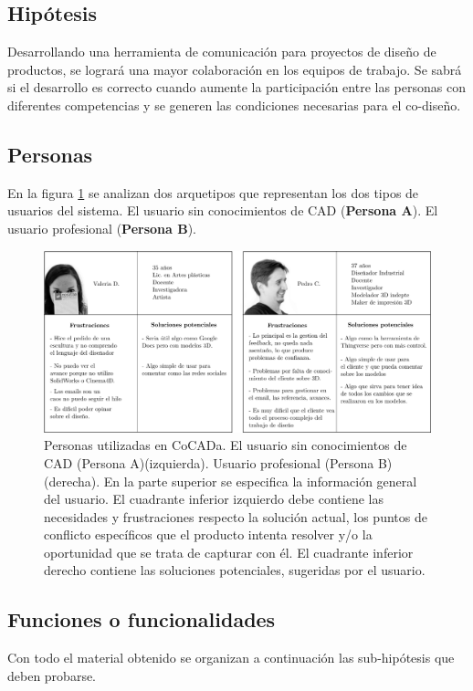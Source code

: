 \subsection{Hipótesis}
Desarrollando una herramienta de comunicación para proyectos de diseño de productos, se logrará una mayor colaboración en los equipos de trabajo. %
Se sabrá si el desarrollo es correcto cuando aumente la participación entre las personas con diferentes competencias y se generen las condiciones necesarias para el co-diseño.

\subsection{Personas}
\label{personas}
En la figura \ref{fig:persona1} se analizan dos arquetipos que representan los dos tipos de usuarios del sistema. El usuario sin conocimientos de CAD (\textbf{Persona A}). El usuario profesional (\textbf{Persona B}).

\begin{figure}[ht]
\includegraphics[width=16cm]{Img/Desarrollo/persona1.png}
\centering
\caption{\footnotesize{Personas utilizadas en CoCADa. El usuario sin conocimientos de CAD (Persona A)(izquierda). Usuario profesional (Persona B)(derecha). En la parte superior se especifica la información general del usuario. El cuadrante inferior izquierdo debe contiene las necesidades y  frustraciones respecto la solución actual, los puntos de conflicto específicos que el producto intenta resolver y/o la oportunidad que se trata de capturar con él. El cuadrante inferior derecho contiene las soluciones potenciales, sugeridas por el usuario.}}
\label{fig:persona1}
\end{figure}

\clearpage
\subsection{Funciones o funcionalidades}
\label{section:subhipo}
Con todo el material obtenido se organizan a continuación las sub-hipótesis que deben probarse. 

